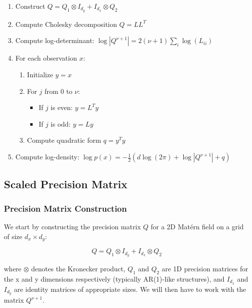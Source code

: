 \documentclass[
  12pt]{article}
\providecommand{\tightlist}{%
  \setlength{\itemsep}{0pt}\setlength{\parskip}{0pt}}\usepackage{longtable,booktabs,array}
\begin{document}
\begin{enumerate}
\def\labelenumi{\arabic{enumi}.}
\tightlist
\item
  Construct \(Q = Q_1 \otimes I_{d_y} + I_{d_x} \otimes Q_2\)
\item
  Compute Cholesky decomposition \(Q = LL^T\)
\item
  Compute log-determinant:
  \(\log|Q^{\nu+1}| = 2(\nu+1)\sum_{i}\log(L_{ii})\)
\item
  For each observation \(x\):

  \begin{enumerate}
  \def\labelenumii{\roman{enumii})}
  \tightlist
  \item
    Initialize \(y = x\)
  \item
    For \(j\) from 0 to \(\nu\):

    \begin{itemize}
    \tightlist
    \item
      If \(j\) is even: \(y = L^T y\)
    \item
      If \(j\) is odd: \(y = L y\)
    \end{itemize}
  \item
    Compute quadratic form \(q = y^Ty\)
  \end{enumerate}
\item
  Compute log-density:
  \(\log p(x) = -\frac{1}{2}(d\log(2\pi) + \log|Q^{\nu+1}| + q)\)
\end{enumerate}

\subsection{Scaled Precision Matrix}\label{scaled-precision-matrix}

\subsubsection{Precision Matrix
Construction}\label{precision-matrix-construction-1}

We start by constructing the precision matrix \(Q\) for a 2D Matérn
field on a grid of size \(d_x \times d_y\):

\[
Q = Q_1 \otimes I_{d_y} + I_{d_x} \otimes Q_2 
\]

where \(\otimes\) denotes the Kronecker product, \(Q_1\) and \(Q_2\) are
1D precision matrices for the x and y dimensions respectively (typically
AR(1)-like structures), and \(I_{d_x}\) and \(I_{d_y}\) are identity
matrices of appropriate sizes. We will then have to work with the matrix
\(Q^{\nu + 1}\).
\end{document}
